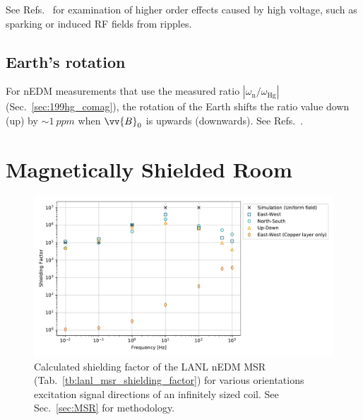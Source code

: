 See Refs.~\cite{baker_apparatus_2014, pendlebury_revised_2015} for examination of higher order effects caused by high voltage, such as sparking or induced RF fields from ripples.

\subsection*{Earth's rotation}

For nEDM measurements that use the measured ratio $|\omega_\text{n}/\omega_\text{Hg}|$ (Sec.~\ref{sec:199hg_comag}), the rotation of the Earth shifts the ratio value down (up) by $\sim\qty{1}{ppm}$ when $\vv{B}_0$ is upwards (downwards). See Refs.~\cite{lamoreaux_earth_rotation_comment, baker_reply_to_lamoreaux, pendlebury_revised_2015}.


\section
{
    \texorpdfstring{Magnetically Shielded Room}
                    {Magnetically Shielded Room}\label{sec:MSR}
}


\begin{figure}
    \centering
    \includegraphics[width=\textwidth]{figures/chupp_msr_data.pdf}
    \caption
    {Calculated shielding factor of the LANL nEDM MSR (Tab.~\ref{tb:lanl_msr_shielding_factor}) for various orientations excitation signal directions of an infinitely sized coil. See Sec.~\ref{sec:MSR} for methodology.}
    \label{fig:MSR-shielding-factor}
\end{figure}

